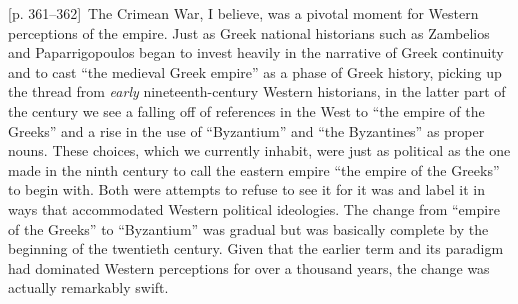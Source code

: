 \documentclass[10pt,a4paper]{article}
\begin{document}
{\scriptsize\color{gray}[p. 361–362]}\ The Crimean War, I believe, was a pivotal moment for Western perceptions of the empire. Just as Greek national historians such as Zambelios and Paparrigopoulos began to invest heavily in the narrative of Greek continuity and to cast “the medieval Greek empire” as a phase of Greek history, picking up the thread from \textit{early} nineteenth-century Western historians, in the latter part of the century we see a falling off of references in the West to “the empire of the Greeks” and a rise in the use of “Byzantium” and “the Byzantines” as proper nouns. These choices, which we currently inhabit, were just as political as the one made in the ninth century to call the eastern empire “the empire of the Greeks” to begin with. Both were attempts to refuse to see it for it was and label it in ways that accommodated Western political ideologies. The change from “empire of the Greeks” to “Byzantium” was gradual but was basically complete by the beginning of the twentieth century. Given that the earlier term and its paradigm had dominated Western perceptions for over a thousand years, the change was actually remarkably swift.\par
\end{document}
